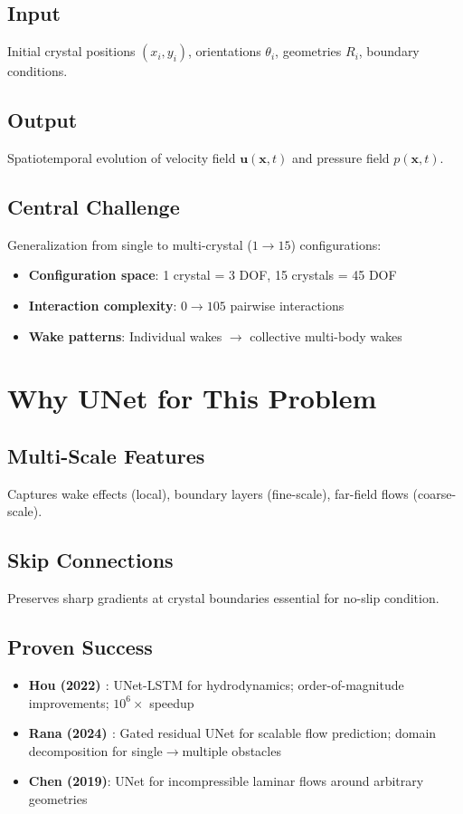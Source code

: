 \subsection{Input}
Initial crystal positions $(x_i, y_i)$, orientations $\theta_i$, geometries $R_i$, boundary conditions.

\subsection{Output}
Spatiotemporal evolution of velocity field $\mathbf{u}(\mathbf{x},t)$ and pressure field $p(\mathbf{x},t)$.

\subsection{Central Challenge}
Generalization from single to multi-crystal ($1 \rightarrow 15$) configurations:
\begin{itemize}
    \item \textbf{Configuration space}: 1 crystal = 3 DOF, 15 crystals = 45 DOF
    \item \textbf{Interaction complexity}: $0 \rightarrow 105$ pairwise interactions
    \item \textbf{Wake patterns}: Individual wakes $\rightarrow$ collective multi-body wakes
\end{itemize}

\section{Why UNet for This Problem}

\subsection{Multi-Scale Features}
Captures wake effects (local), boundary layers (fine-scale), far-field flows (coarse-scale).

\subsection{Skip Connections}
Preserves sharp gradients at crystal boundaries essential for no-slip condition.

\subsection{Proven Success}
\begin{itemize}
    \item \textbf{Hou (2022) \cite{hou2022}}: UNet-LSTM for hydrodynamics; order-of-magnitude improvements; $10^6\times$ speedup
    \item \textbf{Rana (2024) \cite{rana2024}}: Gated residual UNet for scalable flow prediction; domain decomposition for single$\rightarrow$multiple obstacles
    \item \textbf{Chen (2019)}: UNet for incompressible laminar flows around arbitrary geometries
\end{itemize}

